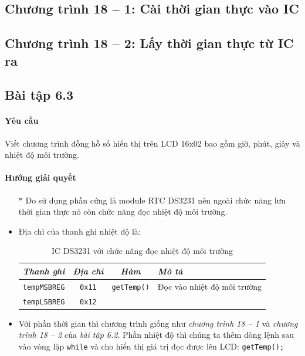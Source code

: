 \subsection*{Chương trình 18 -- 1: Cài thời gian thực vào IC}

\subsection*{Chương trình 18 -- 2: Lấy thời gian thực từ IC ra}

\newpage
\subsection{Bài tập 6.3}
\label{Ex:ds3231-2}
\paragraph{Yêu cầu}Viết chương trình đồng hồ số hiển thị trên LCD 16x02 bao gồm giờ, phút, giây và nhiệt độ môi trường.
\paragraph{Hướng giải quyết}
\begin{itemize}
\item[$\ast$] Do sử dụng phần cứng là module RTC DS3231 nên ngoài chức năng lưu thời gian thực nó còn chức năng đọc nhiệt độ môi trường.
\item Địa chỉ của thanh ghi nhiệt độ là:
\begin{table}[!h]
\begin{center}
\begin{tabular}{|l|c|c|l|}\hline
\textit{Thanh ghi} & \textit{Địa chỉ} & \textit{Hàm} & \textit{Mô tả}\\ \hline
\verb|tempMSBREG| & \verb|0x11| & \verb|getTemp()| & Đọc vào nhiệt độ môi trường \\ \hline
\verb|tempLSBREG| & \verb|0x12| & & \\ \hline
\end{tabular}
\end{center}
\caption{IC DS3231 với chức năng đọc nhiệt độ môi trường}
\end{table}
\item Với phần thời gian thì chương trình giống như \textit{chương trình 18 -- 1} và \textit{chương trình 18 -- 2} của \textit{bài tập 6.2}. Phần nhiệt độ thì chúng ta thêm dòng lệnh sau vào vòng lặp \verb|while| và cho hiển thị giá trị đọc được lên LCD: \verb|getTemp();|
\end{itemize}
